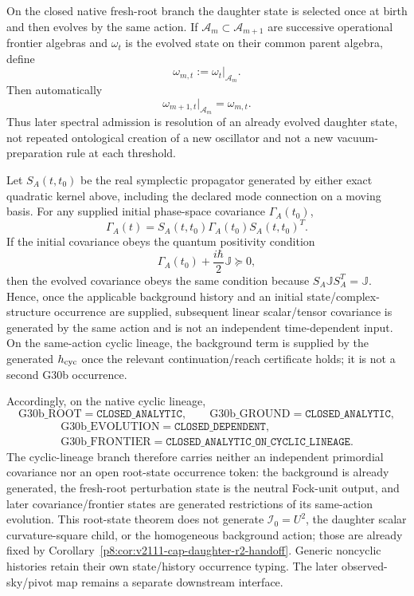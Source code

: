 \documentclass[12pt,a4paper]{article}
\begin{document}
\begin{remark}
\label{p8:rem:v2105-one-birth-state-frontier-restriction}
On the closed native fresh-root branch the daughter state is selected once at birth and then
evolves by the same action.  If \(\mathcal A_m\subset\mathcal A_{m+1}\) are
successive operational frontier algebras and \(\omega_t\) is the evolved
state on their common parent algebra, define
\[
 \omega_{m,t}:=\omega_t|_{\mathcal A_m}.
\]
Then automatically
\[
 \omega_{m+1,t}|_{\mathcal A_m}=\omega_{m,t}.
\]
Thus later spectral admission is resolution of an already evolved daughter
state, not repeated ontological creation of a new oscillator and not a new
vacuum-preparation rule at each threshold.
\end{remark}

\begin{corollary}
\label{p8:cor:v245-deterministic-covariance-transport}
Let \(S_A(t,t_0)\) be the real symplectic propagator generated by either exact
quadratic kernel above, including the declared mode connection on a moving
basis.  For any supplied initial phase-space covariance \(\Gamma_A(t_0)\),
\[
 \boxed{\Gamma_A(t)=S_A(t,t_0)\Gamma_A(t_0)S_A(t,t_0)^T.}
\]
If the initial covariance obeys the quantum positivity condition
\[
 \Gamma_A(t_0)+\frac{i\hbar}{2}\mathbb J\succeq0,
\]
then the evolved covariance obeys the same condition because
\(S_A\mathbb J S_A^T=\mathbb J\).  Hence, once the applicable background
history and an initial state/complex-structure occurrence are supplied,
subsequent linear scalar/tensor covariance is generated by the same action and
is not an independent time-dependent input.  On the same-action cyclic
lineage, the background term is supplied by the generated
\(h_{\rm cyc}\) once the relevant continuation/reach certificate holds; it is
not a second G30b occurrence.

Accordingly, on the native cyclic lineage,
\[
 \boxed{\mathrm{G30b\_ROOT}=\texttt{CLOSED\_ANALYTIC}},\qquad
 \boxed{\mathrm{G30b\_GROUND}=\texttt{CLOSED\_ANALYTIC}},
\]
\[
 \begin{gathered}
 \boxed{\mathrm{G30b\_EVOLUTION}=\texttt{CLOSED\_DEPENDENT}},\\
 \boxed{\mathrm{G30b\_FRONTIER}=\texttt{CLOSED\_ANALYTIC\_ON\_CYCLIC\_LINEAGE}}.
 \end{gathered}
\]
The cyclic-lineage branch therefore carries neither an independent primordial
covariance nor an open root-state occurrence token: the background is already
generated, the fresh-root perturbation state is the neutral Fock-unit output,
and later covariance/frontier states are generated restrictions of its
same-action evolution.  This root-state theorem does not generate
\(\mathcal I_0=U^2\), the daughter scalar curvature-square child, or the homogeneous
background action; those are already fixed by
Corollary~\ref{p8:cor:v2111-cap-daughter-r2-handoff}.  Generic noncyclic
histories retain their own state/history occurrence typing.  The later
observed-sky/pivot map remains a separate downstream interface.
\end{corollary}
\end{document}
